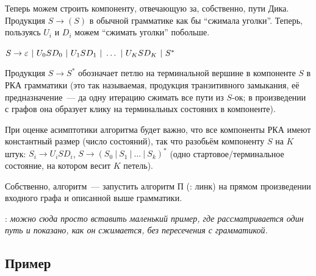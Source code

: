 Теперь можем строить компоненту, отвечающую за, собственно, пути Дика. Продукция $S \to ( S )$ в обычной грамматике как бы ``сжимала уголки''. Теперь, пользуясь $U_i$ и $D_i$ можем ``сжимать уголки'' побольше.

$S \rightarrow \varepsilon~|~U_0 S D_0~|~U_1 S D_1~|~ \dots ~|~U_K S D_K~|~S^*$

Продукция $S \to S^*$ обозначает петлю на терминальной вершине в компоненте $S$ в РКА грамматики (это так называемая, продукция транзитивного замыкания, её предназначение~--- да одну итерацию сжимать все пути из $S$-ок; в произведении с графов она образует клику на терминальных состояних в компоненте).

При оценке асимптотики алгоритма будет важно, что все компоненты РКА имеют константный размер (число состояний), так что разобьём компоненту $S$ на $K$ штук: $S_i \to U_i S D_i$, $S \to (S_0~|~S_1~|~ \dots ~|~ S_k)^*$ (одно стартовое/терминальное состояние, на котором весит $K$ петель).

Собственно, алгоритм~--- запустить алгоритм П (\TODO: линк) на прямом произведении входного графа и описанной выше грамматики.


\TODO: \textit{можно сюда просто вставить маленький пример, где рассматривается один путь и показано, как он сжимается, без пересечения с грамматикой.}


\subsection{Пример}

